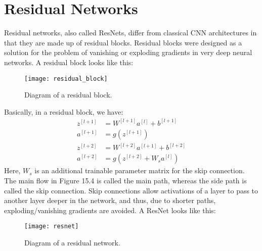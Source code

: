 \documentclass[a4paper, 12pt]{report}
\begin{document}
\section{Residual Networks}
Residual networks, also called ResNets, differ from classical CNN architectures in that they are made up of residual blocks. Residual blocks were designed as a solution for the problem of vanishing or exploding gradients in very deep neural networks. A residual block looks like this:
\begin{figure}[H]
\centering
\texttt{[image: residual\_block]}
\caption{Diagram of a residual block.}
\end{figure}
Basically, in a residual block, we have:
\begin{align*}
z^{[l+1]} &= W^{[l+1]}a^{[l]} + b^{[l+1]}\\
a^{[l+1]} &= g(z^{[l+1]})\\
z^{[l+2]} &= W^{[l+2]}a^{[l+1]} + b^{[l+2]}\\
a^{[l+2]} &= g(z^{[l+2]} + W_sa^{[l]})
\end{align*}
Here, $W_s$ is an additional trainable parameter matrix for the skip connection. The main flow in Figure 15.4 is called the main path, whereas the side path is called the skip connection. Skip connections allow activations of a layer to pass to another layer deeper in the network, and thus, due to shorter paths, exploding/vanishing gradients are avoided. A ResNet looks like this:
\begin{figure}[H]
\centering
\texttt{[image: resnet]}
\caption{Diagram of a residual network.}
\end{figure}
\end{document}
